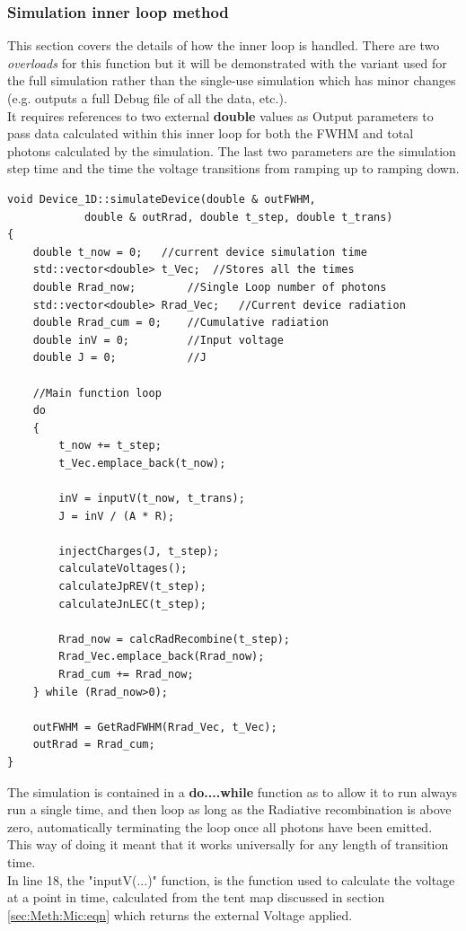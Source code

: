 \documentclass[titlepage]{article}
\begin{document}
\subsubsection{Simulation inner loop method}
This section covers the details of how the inner loop is handled. There are two \textit{overloads} for this function but it will be demonstrated with the variant used for the full simulation rather than the single-use simulation which has minor changes (e.g. outputs a full Debug file of all the data, etc.).\\
It requires references to two external \textbf{double} values as Output parameters to pass data calculated within this inner loop for both the FWHM and total photons calculated by the simulation. The last two parameters are the simulation step time and the time the voltage transitions from ramping up to ramping down.
\begin{lstlisting}
void Device_1D::simulateDevice(double & outFWHM, 
			double & outRrad, double t_step, double t_trans)
{
	double t_now = 0;	//current device simulation time
	std::vector<double> t_Vec;	//Stores all the times
	double Rrad_now;		//Single Loop number of photons
	std::vector<double> Rrad_Vec;	//Current device radiation
	double Rrad_cum = 0;	//Cumulative radiation
	double inV = 0;			//Input voltage
	double J = 0;			//J
	
	//Main function loop
	do
	{
		t_now += t_step;
		t_Vec.emplace_back(t_now);
		
		inV = inputV(t_now, t_trans);
		J = inV / (A * R);
		
		injectCharges(J, t_step);
		calculateVoltages();
		calculateJpREV(t_step);
		calculateJnLEC(t_step);
		
		Rrad_now = calcRadRecombine(t_step);
		Rrad_Vec.emplace_back(Rrad_now);
		Rrad_cum += Rrad_now;
	} while (Rrad_now>0);
	
	outFWHM = GetRadFWHM(Rrad_Vec, t_Vec);
	outRrad = Rrad_cum;
}
\end{lstlisting}
The simulation is contained in a \textbf{do....while} function as to allow it to run always run a single time, and then loop as long as the Radiative recombination is above zero, automatically terminating the loop once all photons have been emitted. This way of doing it meant that it works universally for any length of transition time.\\
In line 18, the "inputV(...)" function, is the function used to calculate the voltage at a point in time, calculated from the tent map discussed in section \ref{sec:Meth:Mic:eqn} which returns the external Voltage applied.
\end{document}
